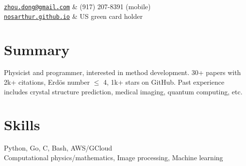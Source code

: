 \documentclass[centered,11pt,overlapped]{res}
\begin{document}


\begin{resume}

\begin{ncolumn}{2}
   {\tt \href{mailto:zhou.dong@gmail.com}{zhou.dong@gmail.com}} &  (917) 207-8391 (mobile) \\
   {\tt \href{https://nosarthur.github.io}{nosarthur.github.io}} &  US green card holder
\end{ncolumn}


\section{\sc Summary}
Physicist and programmer, interested in method development.
30+ papers with 2k+ citations,
Erd\"{o}s number $\le$ 4,
1k+ stars on GitHub.
Past experience includes crystal structure prediction, medical imaging, quantum computing, etc.


\section{\sc Skills}
Python, Go, C, Bash, AWS/GCloud \\
Computational physics/mathematics, Image processing, Machine learning



\end{resume}
\end{document}
